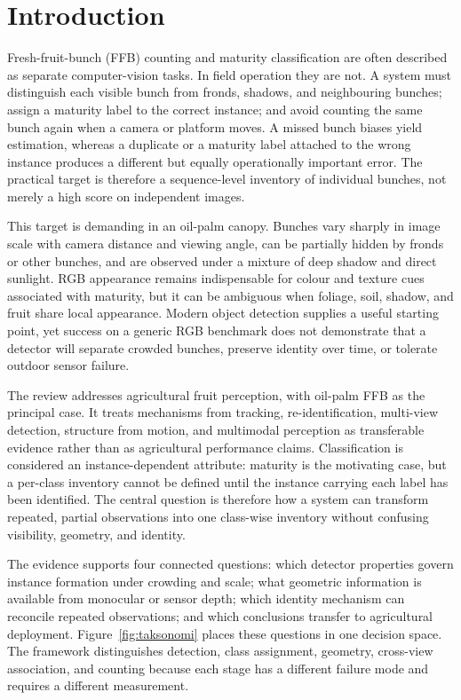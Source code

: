 \section{Introduction}

Fresh-fruit-bunch (FFB) counting and maturity classification are often described as separate computer-vision tasks. In field operation they are not. A system must distinguish each visible bunch from fronds, shadows, and neighbouring bunches; assign a maturity label to the correct instance; and avoid counting the same bunch again when a camera or platform moves. A missed bunch biases yield estimation, whereas a duplicate or a maturity label attached to the wrong instance produces a different but equally operationally important error. The practical target is therefore a sequence-level inventory of individual bunches, not merely a high score on independent images.

This target is demanding in an oil-palm canopy. Bunches vary sharply in image scale with camera distance and viewing angle, can be partially hidden by fronds or other bunches, and are observed under a mixture of deep shadow and direct sunlight. RGB appearance remains indispensable for colour and texture cues associated with maturity, but it can be ambiguous when foliage, soil, shadow, and fruit share local appearance. Modern object detection supplies a useful starting point, yet success on a generic RGB benchmark does not demonstrate that a detector will separate crowded bunches, preserve identity over time, or tolerate outdoor sensor failure.

The review addresses agricultural fruit perception, with oil-palm FFB as the principal case. It treats mechanisms from tracking, re-identification, multi-view detection, structure from motion, and multimodal perception as transferable evidence rather than as agricultural performance claims. Classification is considered an instance-dependent attribute: maturity is the motivating case, but a per-class inventory cannot be defined until the instance carrying each label has been identified. The central question is therefore how a system can transform repeated, partial observations into one class-wise inventory without confusing visibility, geometry, and identity.

The evidence supports four connected questions: which detector properties govern instance formation under crowding and scale; what geometric information is available from monocular or sensor depth; which identity mechanism can reconcile repeated observations; and which conclusions transfer to agricultural deployment. Figure~\ref{fig:taksonomi} places these questions in one decision space. The framework distinguishes detection, class assignment, geometry, cross-view association, and counting because each stage has a different failure mode and requires a different measurement.

